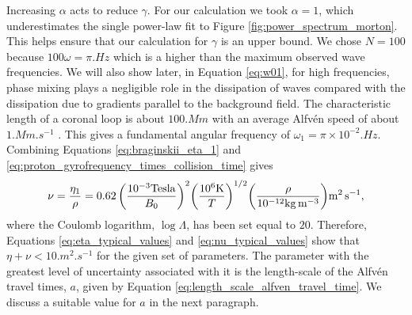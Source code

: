 Increasing $\alpha$ acts to reduce $\gamma$. For our calculation we took $\alpha=1$, which underestimates the single power-law fit to Figure \ref{fig:power_spectrum_morton}. This helps ensure that our calculation for $\gamma$ is an upper bound. We chose $N=100$ because $100\omega = \pi\si{.Hz}$ which is a higher than the maximum observed wave frequencies. We will also show later, in Equation \eqref{eq:w01}, for high frequencies, phase mixing plays a negligible role in the dissipation of waves compared with the dissipation due to gradients parallel to the background field. The characteristic length of a coronal loop is about $100\si{.Mm}$ \citep{O'Neill2005} with an average Alfv\'en speed of about $1\si{.Mm.s^{-1}}$ \citep{McIntosh2011}. This gives a fundamental angular frequency of $\omega_1=\pi\times10^{-2}\si{.Hz}$. Combining Equations \eqref{eq:braginskii_eta_1} and \eqref{eq:proton_gyrofrequency_times_collision_time} gives
\begin{equation}
    \label{eq:nu_typical_values}
    \nu=\frac{\eta_1}{\rho} = 0.62\,\qty(\frac{10^{-3}\si{.Tesla}}{B_0})^2\qty(\frac{10^6\si{.K}}{T})^{1/2}\qty(\frac{\rho}{10^{-12}\si{.kg.m^{-3}}})\si{.m^2.s^{-1}},
\end{equation}
where the Coulomb logarithm, $\log\Lambda$, has been set equal to $20$. Therefore, Equations \eqref{eq:eta_typical_values} and \eqref{eq:nu_typical_values} show that $\eta+\nu<10\si{.m^2.s^{-1}}$ for the given set of parameters. The parameter with the greatest level of uncertainty associated with it is the length-scale of the Alfv\'en travel times, $a$, given by Equation \eqref{eq:length_scale_alfven_travel_time}. We discuss a suitable value for $a$ in the next paragraph. 

